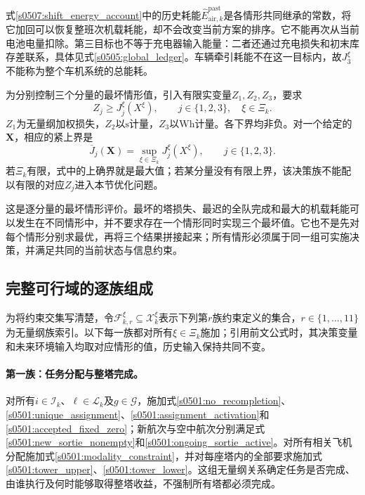 式\eqref{s0507:shift_energy_account}中的历史耗能$\widehat E_{\mathrm{air},k}^{\mathrm{past}}$是各情形共同继承的常数，将它加回可以恢复整班次机载耗能，却不会改变当前方案的排序。它不能再次从当前电池电量扣除。第三目标也不等于充电器输入能量：二者还通过充电损失和初末库存差联系，具体见式\eqref{s0505:global_ledger}。车辆牵引耗能不在这一目标内，故$J_3^\xi$不能称为整个车机系统的总能耗。

为分别控制三个分量的最坏情形值，引入有限实变量$Z_1,Z_2,Z_3$，要求
\begin{equation}
 Z_j\ge J_j^\xi(X^\xi),
 \qquad j\in\{1,2,3\},\quad\xi\in\Xi_k.
 \label{s0508:robust_epigraph}
\end{equation}
$Z_1$为无量纲加权损失，$Z_2$以$\mathrm s$计量，$Z_3$以$\mathrm{Wh}$计量。各下界均非负。对一个给定的$\mathbf X$，相应的紧上界是
\begin{equation}
 \overline J_j(\mathbf X)
 =\sup_{\xi\in\Xi_k}J_j^\xi(X^\xi),
 \qquad j\in\{1,2,3\}.
 \label{s0508:componentwise_worst}
\end{equation}
若$\Xi_k$有限，式中的上确界就是最大值；若某分量没有有限上界，该决策族不能配以有限的对应$Z_j$进入本节优化问题。

这是逐分量的最坏情形评价。最坏的塔损失、最迟的全队完成和最大的机载耗能可以发生在不同情形中，并不要求存在一个情形同时实现三个最坏值。它也不是先对每个情形分别求最优，再将三个结果拼接起来；所有情形必须属于同一组可实施决策，并满足共同的当前状态与信息约束。

\subsection{完整可行域的逐族组成}

为将约束交集写清楚，令$\mathcal F_{k,r}^\xi\subseteq\mathscr X_k^\xi$表示下列第$r$族约束定义的集合，$r\in\{1,\ldots,11\}$为无量纲族索引。以下每一族都对所有$\xi\in\Xi_k$施加；引用前文公式时，其决策变量和未来环境输入均取对应情形的值，历史输入保持共同不变。

\paragraph{第一族：任务分配与整塔完成。}
对所有$i\in\mathcal I_k$、$\ell\in\mathcal L_k$及$g\in\mathcal G$，施加式\eqref{s0501:no_recompletion}、\eqref{s0501:unique_assignment}、\eqref{s0501:assignment_activation}和\eqref{s0501:accepted_fixed_zero}；新航次与空中航次分别满足式\eqref{s0501:new_sortie_nonempty}和\eqref{s0501:ongoing_sortie_active}。对所有相关飞机分配施加式\eqref{s0501:modality_constraint}，并对每座塔内的全部要求施加式\eqref{s0501:tower_upper}、\eqref{s0501:tower_lower}。这组无量纲关系确定任务是否完成、由谁执行及何时能够取得整塔收益，不强制所有塔都必须完成。

